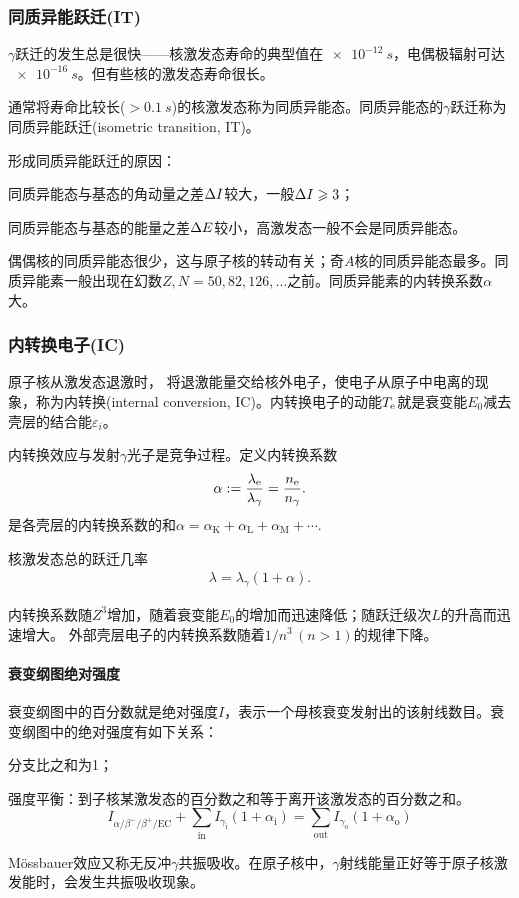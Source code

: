 \subsubsection{同质异能跃迁(IT)}
$\gamma$跃迁的发生总是很快——核激发态寿命的典型值在$\SI{e-12}{s}$，电偶极辐射可达$\SI{e-16}{s}$。但有些核的激发态寿命很长。

通常将寿命比较长($>\SI{0.1}{s}$)的核激发态称为同质异能态。同质异能态的$\gamma$跃迁称为同质异能跃迁(isometric transition, IT)。

形成同质异能跃迁的原因：
\begin{compactenum}
	\item 同质异能态与基态的角动量之差$\Delta I$较大，一般$\Delta I\geqslant 3$；
	\item 同质异能态与基态的能量之差$\Delta E$较小，高激发态一般不会是同质异能态。
\end{compactenum}
偶偶核的同质异能态很少，这与原子核的转动有关；奇$A$核的同质异能态最多。同质异能素一般出现在幻数$Z,N=50,82,126,\ldots$之前。同质异能素的内转换系数$\alpha$大。
\subsubsection{内转换电子(IC)}
原子核从激发态退激时，%
将退激能量交给核外电子，使电子从原子中电离的现象，称为内转换(internal conversion, IC)。内转换电子的动能$T_\mathrm e$就是衰变能$E_0$减去壳层的结合能$\varepsilon_i$。

内转换效应与发射$\gamma$光子是竞争过程。定义内转换系数
\begin{align}
	\alpha:=\frac{\lambda_\mathrm e}{\lambda_\gamma}=\frac{n_\mathrm e}{n_\gamma}.
\end{align}
是各壳层的内转换系数的和$\alpha=\alpha_\mathrm K+\alpha_\mathrm L+\alpha_\mathrm M+\cdots.$

核激发态总的跃迁几率
\begin{align}
	\lambda=\lambda_\gamma(1+\alpha).
\end{align}

内转换系数随$Z^3$增加，随着衰变能$E_0$的增加而迅速降低；随跃迁级次$L$的升高而迅速增大。
外部壳层电子的内转换系数随着$1/n^3\,(n>1)$的规律下降。
\paragraph{衰变纲图绝对强度}衰变纲图中的百分数就是绝对强度$I$，表示一个母核衰变发射出的该射线数目。衰变纲图中的绝对强度有如下关系：
\begin{compactenum}
	\item 分支比之和为1；
	\item 强度平衡：到子核某激发态的百分数之和等于离开该激发态的百分数之和。
	\[
		I_{\alpha/\beta^-/\beta^+/\mathrm{EC}}+\sum_{\mathrm{in}} I_{\gamma_\mathrm i}(1+\alpha_\mathrm i)=\sum_{\mathrm{out}} I_{\gamma_\mathrm o}(1+\alpha_\mathrm o)
	\]
\end{compactenum}
\label{Mossbauer}
Mössbauer效应又称无反冲$\gamma$共振吸收。在原子核中，$\gamma$射线能量正好等于原子核激发能时，会发生共振吸收现象。

